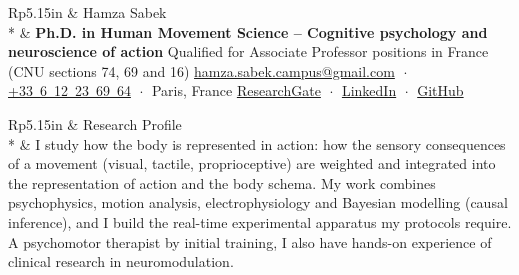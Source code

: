 \documentclass[a4paper, 11pt]{article}
\newcommand{\headingfont}{\Large\color{PineGreen}}
\newenvironment{SectionTable}[1]{
	\renewcommand*{\arraystretch}{1.1}
	\setlength{\tabcolsep}{8pt}
	\begin{longtable}{Rp{5.15in}} & #1 \\*}
{\end{longtable}\vspace{2pt}}
\begin{document}
\begin{SectionTable}{\Huge Hamza Sabek}
	& \textbf{Ph.D. in Human Movement Science -- Cognitive psychology and neuroscience of action}\newline
	Qualified for Associate Professor positions in France (CNU sections 74, 69 and 16)\newline
	\href{mailto:hamza.sabek.campus@gmail.com}{hamza.sabek.campus@gmail.com} $\;\boldsymbol{\cdot}\;$
	\href{tel:+33612236964}{+33~6~12~23~69~64} $\;\boldsymbol{\cdot}\;$ Paris, France\newline
	\href{https://www.researchgate.net/profile/Hamza-Sabek}{ResearchGate} $\;\boldsymbol{\cdot}\;$
	\href{https://www.linkedin.com/in/hamza-sabek-19819470/}{LinkedIn} $\;\boldsymbol{\cdot}\;$
	\href{https://github.com/hamzasabek}{GitHub} \\
\end{SectionTable}

\begin{SectionTable}{\headingfont Research Profile}
	& I study how the body is represented in action: how the sensory consequences of a movement (visual, tactile, proprioceptive) are weighted and integrated into the representation of action and the body schema. My work combines psychophysics, motion analysis, electrophysiology and Bayesian modelling (causal inference), and I build the real-time experimental apparatus my protocols require. A psychomotor therapist by initial training, I also have hands-on experience of clinical research in neuromodulation. \\
\end{SectionTable}
\end{document}
